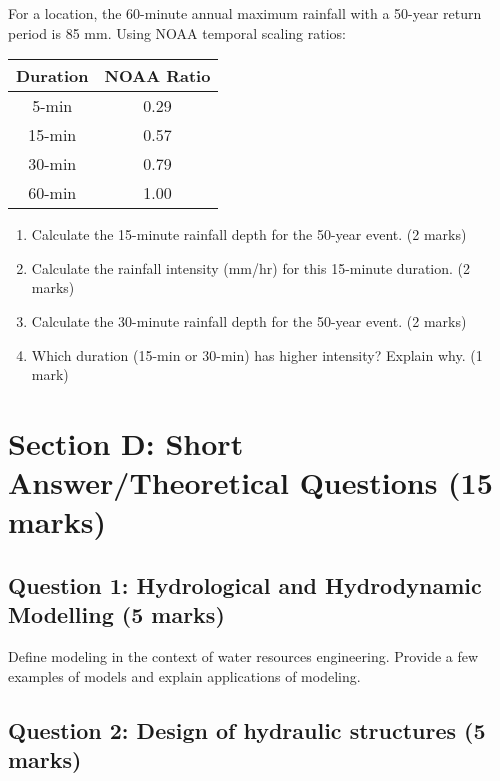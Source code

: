 \documentclass[11pt,a4paper]{article}
\begin{document}
For a location, the 60-minute annual maximum rainfall with a 50-year return period is 85 mm. Using NOAA temporal scaling ratios:

\begin{center}
\begin{tabular}{cc}
\toprule
Duration & NOAA Ratio \\
\midrule
5-min & 0.29 \\
15-min & 0.57 \\
30-min & 0.79 \\
60-min & 1.00 \\
\bottomrule
\end{tabular}
\end{center}

\begin{enumerate}[label=\alph*)]
    \item Calculate the 15-minute rainfall depth for the 50-year event. (2 marks)
    \item Calculate the rainfall intensity (mm/hr) for this 15-minute duration. (2 marks)
    \item Calculate the 30-minute rainfall depth for the 50-year event. (2 marks)
    \item Which duration (15-min or 30-min) has higher intensity? Explain why. (1 mark)
\end{enumerate}

\vspace{7cm}

\newpage

\section*{Section D: Short Answer/Theoretical Questions (15 marks)}

\subsection*{Question 1: Hydrological and Hydrodynamic Modelling (5 marks)}

Define modeling in the context of water resources engineering. Provide a few examples of models and explain applications of modeling. 

\vspace{5cm}

\subsection*{Question 2: Design of hydraulic structures (5 marks)}
\end{document}
